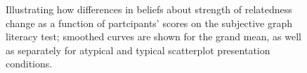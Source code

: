 \documentclass[manuscript,screen,review,anonymous]{acmart}
\begin{document}
\begin{figure}


\caption{\label{fig-lit-smooth}Illustrating how differences in beliefs
about strength of relatedness change as a function of partcipants'
scores on the subjective graph literacy test; smoothed curves are shown
for the grand mean, as well as separately for atypical and typical
scatterplot presentation conditions.}

\end{figure}%
\end{document}
